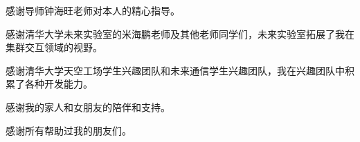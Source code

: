 \begin{acknowledgement}
  感谢导师钟海旺老师对本人的精心指导。


  感谢清华大学未来实验室的米海鹏老师及其他老师同学们，未来实验室拓展了我在集群交互领域的视野。

  感谢清华大学天空工场学生兴趣团队和未来通信学生兴趣团队，我在兴趣团队中积累了各种开发能力。

  感谢我的家人和女朋友的陪伴和支持。
  
  感谢所有帮助过我的朋友们。

\end{acknowledgement}
